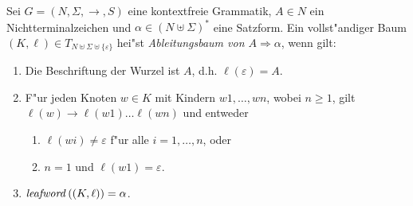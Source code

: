 \documentclass[12pt,a4paper]{article}
\begin{document}
\begin{definition}[Ableitungsbaum]
  Sei $G=(N,\Sigma,\to,S)$ eine kontextfreie Grammatik, $A \in N$ ein Nichtterminalzeichen und
  $\alpha \in (N \uplus \Sigma)^*$ eine Satzform. Ein vollst"andiger Baum
  $(K,\ell) \in T_{N \uplus \Sigma \uplus \{\varepsilon\}}$ hei"st
  \emph{Ableitungsbaum von $A \Rightarrow \alpha$}, wenn gilt:
  \begin{enumerate}
  \item Die Beschriftung der Wurzel ist $A$, d.h. $\ell(\varepsilon)=A$.
  \item F"ur jeden Knoten $w \in K$ mit Kindern $w1,\ldots,wn$, wobei $n \ge 1$, gilt
    $\ell(w) \to \ell(w1)\ldots\ell(wn)$ und entweder
    \begin{enumerate}
    \item $\ell(wi)\ne\varepsilon$ f"ur alle $i=1,\ldots,n$, oder
    \item $n = 1$ und $\ell(w1)=\varepsilon$.
    \end{enumerate}
  \item $\mathit{leafword}\,((K,\ell)) = \alpha$.
  \end{enumerate}
\end{definition}
\end{document}
